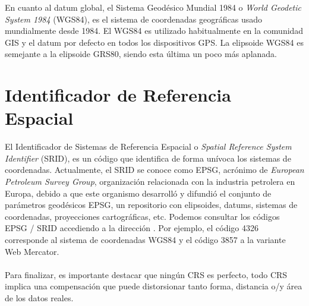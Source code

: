 En cuanto al datum global, el Sistema Geodésico Mundial 1984 o \textit{World Geodetic System 1984} (WGS84), es el sistema de coordenadas geográficas usado mundialmente desde 1984.
El WGS84 es utilizado habitualmente en la comunidad GIS y el datum por defecto en todos los dispositivos GPS. 
La elipsoide WGS84 es semejante a la elipsoide GRS80, siendo esta última un poco más aplanada.

\section{Identificador de Referencia Espacial}

El Identificador de Sistemas de Referencia Espacial o \textit{Spatial Reference System Identifier} (SRID), es un código que identifica de forma unívoca los sistemas de coordenadas.
Actualmente, el SRID se conoce como EPSG, acrónimo de \textit{European Petroleum Survey Group}, organización relacionada con la industria petrolera en Europa, debido a que este organismo 
desarrolló y difundió el conjunto de parámetros geodésicos EPSG, un repositorio con elipsoides, datums, sistemas de coordenadas, proyecciones cartográficas, etc.
Podemos consultar los códigos EPSG / SRID accediendo a la dirección \cite{EPSG-SRID-codes}.
Por ejemplo, el código 4326 corresponde al sistema de coordenadas WGS84 y el código 3857 a la variante Web Mercator.
\\
\\
Para finalizar, es importante destacar que ningún CRS es perfecto, todo CRS implica una compensación que puede distorsionar tanto forma, distancia o/y área de los datos reales.

